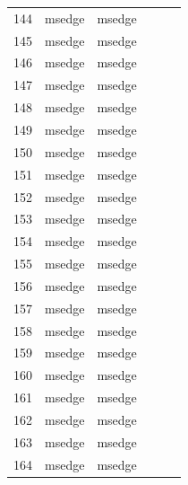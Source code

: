 \documentclass[a4paper,twoside,12pt]{book}
\begin{document}
\begin{appendices}
\begin{table}
\begin{tabular}{llllll}
		144 &  msedge &         msedge &                &                &                \\
		145 &  msedge &         msedge &                &                &                \\
		146 &  msedge &         msedge &                &                &                \\
		147 &  msedge &         msedge &                &                &                \\
		148 &  msedge &         msedge &                &                &                \\
		149 &  msedge &         msedge &                &                &                \\
		150 &  msedge &         msedge &                &                &                \\
		151 &  msedge &         msedge &                &                &                \\
		152 &  msedge &         msedge &                &                &                \\
		153 &  msedge &         msedge &                &                &                \\
		154 &  msedge &         msedge &                &                &                \\
		155 &  msedge &         msedge &                &                &                \\
		156 &  msedge &         msedge &                &                &                \\
		157 &  msedge &         msedge &                &                &                \\
		158 &  msedge &         msedge &                &                &                \\
		159 &  msedge &         msedge &                &                &                \\
		160 &  msedge &         msedge &                &                &                \\
		161 &  msedge &         msedge &                &                &                \\
		162 &  msedge &         msedge &                &                &                \\
		163 &  msedge &         msedge &                &                &                \\
		164 &  msedge &         msedge &                &                &                \\

\end{tabular}
\end{table}
\end{appendices}
\end{document}
